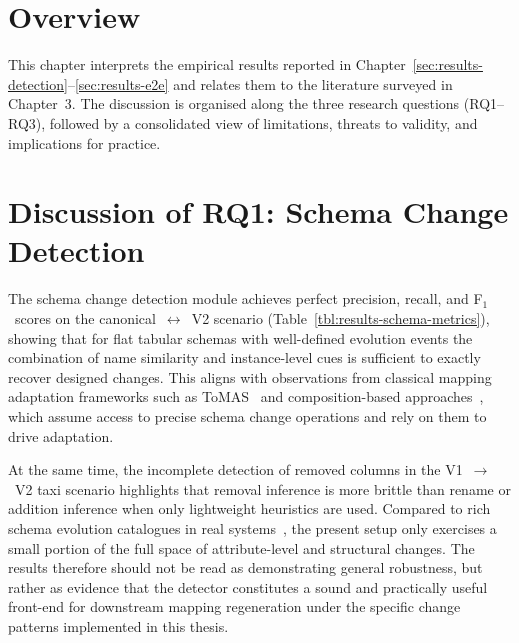 
\section{Overview}
\label{sec:discussion-overview}

This chapter interprets the empirical results reported in Chapter~\ref{sec:results-detection}--\ref{sec:results-e2e} and relates them to the literature surveyed in Chapter~3. The discussion is organised along the three research questions (RQ1--RQ3), followed by a consolidated view of limitations, threats to validity, and implications for practice.


\section{Discussion of RQ1: Schema Change Detection}
\label{sec:discussion-rq1}

The schema change detection module achieves perfect precision, recall, and F\(_1\)~scores on the canonical~$\leftrightarrow$~V2 scenario (Table~\ref{tbl:results-schema-metrics}), showing that for flat tabular schemas with well-defined evolution events the combination of name similarity and instance-level cues is sufficient to exactly recover designed changes. This aligns with observations from classical mapping adaptation frameworks such as ToMAS~\cite{velegrakis2003mapping} and composition-based approaches~\cite{yu2005semantic}, which assume access to precise schema change operations and rely on them to drive adaptation.

At the same time, the incomplete detection of removed columns in the V1~$\rightarrow$~V2 taxi scenario highlights that removal inference is more brittle than rename or addition inference when only lightweight heuristics are used. Compared to rich schema evolution catalogues in real systems~\cite{curino2008schema}, the present setup only exercises a small portion of the full space of attribute-level and structural changes. The results therefore should not be read as demonstrating general robustness, but rather as evidence that the detector constitutes a sound and practically useful front-end for downstream mapping regeneration under the specific change patterns implemented in this thesis.

